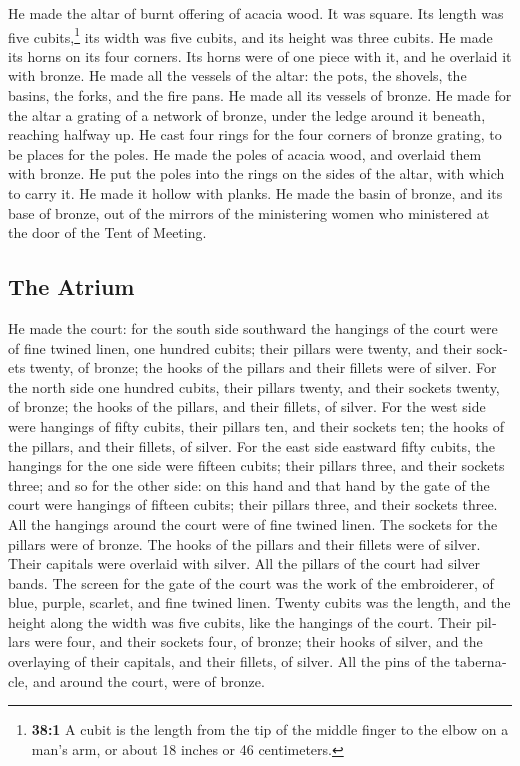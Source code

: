 \begin{paracol}{2}
\begin{otherlanguage}{english}
 He made the altar of burnt offering of acacia wood. It
was square. Its length was five cubits,\footnote{\textbf{38:1} A cubit
  is the length from the tip of the middle finger to the elbow on a
  man's arm, or about 18 inches or 46 centimeters.} its width was five
cubits, and its height was three cubits.  He made its
horns on its four corners. Its horns were of one piece with it, and he
overlaid it with bronze.  He made all the vessels of the
altar: the pots, the shovels, the basins, the forks, and the fire pans.
He made all its vessels of bronze.  He made for the altar
a grating of a network of bronze, under the ledge around it beneath,
reaching halfway up.  He cast four rings for the four
corners of bronze grating, to be places for the poles.  He
made the poles of acacia wood, and overlaid them with bronze.
 He put the poles into the rings on the sides of the
altar, with which to carry it. He made it hollow with planks.
 He made the basin of bronze, and its base of bronze, out
of the mirrors of the ministering women who ministered at the door of
the Tent of Meeting.

\hypertarget{the-atrium}{%
\subsection{The Atrium}\label{the-atrium}}

 He made the court: for the south side southward the
hangings of the court were of fine twined linen, one hundred cubits;
 their pillars were twenty, and their sockets twenty, of
bronze; the hooks of the pillars and their fillets were of silver.
 For the north side one hundred cubits, their pillars
twenty, and their sockets twenty, of bronze; the hooks of the pillars,
and their fillets, of silver.  For the west side were
hangings of fifty cubits, their pillars ten, and their sockets ten; the
hooks of the pillars, and their fillets, of silver.  For
the east side eastward fifty cubits,  the hangings for
the one side were fifteen cubits; their pillars three, and their sockets
three;  and so for the other side: on this hand and that
hand by the gate of the court were hangings of fifteen cubits; their
pillars three, and their sockets three.  All the hangings
around the court were of fine twined linen.  The sockets
for the pillars were of bronze. The hooks of the pillars and their
fillets were of silver. Their capitals were overlaid with silver. All
the pillars of the court had silver bands.  The screen
for the gate of the court was the work of the embroiderer, of blue,
purple, scarlet, and fine twined linen. Twenty cubits was the length,
and the height along the width was five cubits, like the hangings of the
court.  Their pillars were four, and their sockets four,
of bronze; their hooks of silver, and the overlaying of their capitals,
and their fillets, of silver.  All the pins of the
tabernacle, and around the court, were of bronze.


\end{otherlanguage}
\end{paracol}

